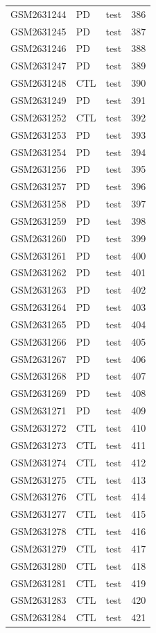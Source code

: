 \begin{footnotesize}
\begin{longtable}{llll}
GSM2631244 & PD & test & 386 \\
GSM2631245 & PD & test & 387 \\
GSM2631246 & PD & test & 388 \\
GSM2631247 & PD & test & 389 \\
GSM2631248 & CTL & test & 390 \\
GSM2631249 & PD & test & 391 \\
GSM2631252 & CTL & test & 392 \\
GSM2631253 & PD & test & 393 \\
GSM2631254 & PD & test & 394 \\
GSM2631256 & PD & test & 395 \\
GSM2631257 & PD & test & 396 \\
GSM2631258 & PD & test & 397 \\
GSM2631259 & PD & test & 398 \\
GSM2631260 & PD & test & 399 \\
GSM2631261 & PD & test & 400 \\
GSM2631262 & PD & test & 401 \\
GSM2631263 & PD & test & 402 \\
GSM2631264 & PD & test & 403 \\
GSM2631265 & PD & test & 404 \\
GSM2631266 & PD & test & 405 \\
GSM2631267 & PD & test & 406 \\
GSM2631268 & PD & test & 407 \\
GSM2631269 & PD & test & 408 \\
GSM2631271 & PD & test & 409 \\
GSM2631272 & CTL & test & 410 \\
GSM2631273 & CTL & test & 411 \\
GSM2631274 & CTL & test & 412 \\
GSM2631275 & CTL & test & 413 \\
GSM2631276 & CTL & test & 414 \\
GSM2631277 & CTL & test & 415 \\
GSM2631278 & CTL & test & 416 \\
GSM2631279 & CTL & test & 417 \\
GSM2631280 & CTL & test & 418 \\
GSM2631281 & CTL & test & 419 \\
GSM2631283 & CTL & test & 420 \\
GSM2631284 & CTL & test & 421 \\

\end{longtable}
\end{footnotesize}

